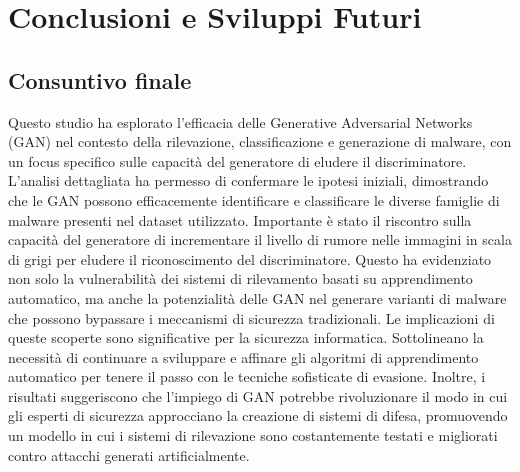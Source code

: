 \chapter{Conclusioni e Sviluppi Futuri}
\label{cap:conclusioni}
\section{Consuntivo finale}
Questo studio ha esplorato l'efficacia delle Generative Adversarial Networks (GAN) nel contesto della rilevazione, classificazione e generazione di malware, con un focus specifico sulle capacità del generatore di eludere il discriminatore. L'analisi dettagliata ha permesso di confermare le ipotesi iniziali, dimostrando che le GAN possono efficacemente identificare e classificare le diverse famiglie di malware presenti nel dataset utilizzato.
Importante è stato il riscontro sulla capacità del generatore di incrementare il livello di rumore nelle immagini in scala di grigi per eludere il riconoscimento del discriminatore. Questo ha evidenziato non solo la vulnerabilità dei sistemi di rilevamento basati su apprendimento automatico, ma anche la potenzialità delle GAN nel generare varianti di malware che possono bypassare i meccanismi di sicurezza tradizionali.
Le implicazioni di queste scoperte sono significative per la sicurezza informatica. Sottolineano la necessità di continuare a sviluppare e affinare gli algoritmi di apprendimento automatico per tenere il passo con le tecniche sofisticate di evasione. Inoltre, i risultati suggeriscono che l'impiego di GAN potrebbe rivoluzionare il modo in cui gli esperti di sicurezza approcciano la creazione di sistemi di difesa, promuovendo un modello in cui i sistemi di rilevazione sono costantemente testati e migliorati contro attacchi generati artificialmente.

